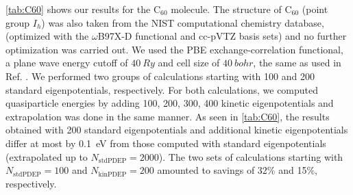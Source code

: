 \documentclass[aip,preprint]{revtex4-1}
\begin{document}
	\autoref{tab:C60} shows our results for the $\mathrm{C_{60}}$ molecule. The structure of $\mathrm{C_{60}}$ (point group $I_h$) was also taken from the NIST computational chemistry database,\cite{NIST-CCCBDB} (optimized with the $\omega$B97X-D functional and cc-pVTZ basis sets) and no further optimization was carried out. We used the PBE exchange-correlation functional, a plane wave energy cutoff of $\SI{40}{\si{Ry}}$ and cell size of $\SI{40}{\si{bohr}}$, the same as used in Ref. . We performed two groups of calculations starting with 100 and 200 standard eigenpotentials, respectively. For both calculations, we computed quasiparticle energies by adding 100, 200, 300, 400 kinetic eigenpotentials and extrapolation was done in the same manner. As seen in \autoref{tab:C60}, the results obtained with 200 standard eigenpotentials and additional kinetic eigenpotentials differ at most by \SI{0.1}{\si{eV}} from those computed with standard eigenpotentials (extrapolated up to $N_\mathrm{stdPDEP}=2000$). The two sets of calculations starting with $N_\mathrm{stdPDEP}=100$ and $N_\mathrm{kinPDEP}=200$ amounted to savings of 32\% and 15\%, respectively.
\end{document}
